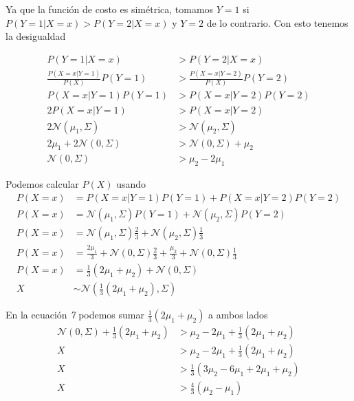 \documentclass{article}
\begin{document}
\begin{enumerate}
Ya que la función de costo es simétrica, tomamos $Y = 1$ si $P(Y = 1 | X = x) > P(Y = 2 | X = x)$ y $Y = 2$ de lo contrario. Con esto tenemos la desigualdad

  \begin{align}
    P(Y = 1 | X = x)                      &> P(Y = 2 | X = x)\\
    \frac{P(X = x | Y = 1)}{P(X)}P(Y = 1) &> \frac{P(X = x | Y = 2)}{P(X)}P(Y = 2)\\
    P(X = x | Y = 1)P(Y = 1)              &> P(X = x | Y = 2)P(Y = 2)\\
    2P(X = x | Y = 1)                     &> P(X = x | Y = 2)\\
    2 \mathcal{N}(\mu_1, \Sigma)          &> \mathcal{N}(\mu_2, \Sigma)\\
    2\mu_1 + 2\mathcal{N}(0, \Sigma)      &> \mathcal{N}(0, \Sigma) + \mu_2\\
    \mathcal{N}(0, \Sigma)                &> \mu_2 - 2\mu_1
  \end{align}

Podemos calcular $P(X)$ usando %
\vspace{-1ex}
  \begin{align*}
    P(X = x) &= P(X=x | Y = 1)P(Y = 1) + P(X=x | Y = 2)P(Y = 2)\\
    P(X = x) &= \mathcal{N}(\mu_1, \Sigma)P(Y = 1) + \mathcal{N}(\mu_2, \Sigma)P(Y = 2)\\
    P(X = x) &= \mathcal{N}(\mu_1, \Sigma)\frac{2}{3} + \mathcal{N}(\mu_2, \Sigma)\frac{1}{3}\\
    P(X = x) &= \frac{2\mu_1}{3} + \mathcal{N}(0, \Sigma)\frac{2}{3} + \frac{\mu_2}{3} + \mathcal{N}(0, \Sigma)\frac{1}{3}\\
    P(X = x) &= \frac{1}{3}(2\mu_1 + \mu_2) + \mathcal{N}(0, \Sigma)\\
    X &\sim \mathcal{N}(\frac{1}{3}(2\mu_1 + \mu_2), \Sigma)
  \end{align*}

En la ecuación \emph{7} podemos sumar $\frac{1}{3}(2\mu_1 + \mu_2)$ a ambos lados
\vspace{-2ex}
\begin{align*}
\mathcal{N}(0, \Sigma) + \frac{1}{3}(2\mu_1 + \mu_2) &> \mu_2 - 2\mu_1 + \frac{1}{3}(2\mu_1 + \mu_2)\\
X &> \mu_2 - 2\mu_1 + \frac{1}{3}(2\mu_1 + \mu_2)\\
X &> \frac{1}{3}(3\mu_2 - 6\mu_1 + 2\mu_1 + \mu_2)\\
X &> \frac{4}{3}(\mu_2 -\mu_1)\\
\end{align*}


\end{enumerate}
\end{document}
